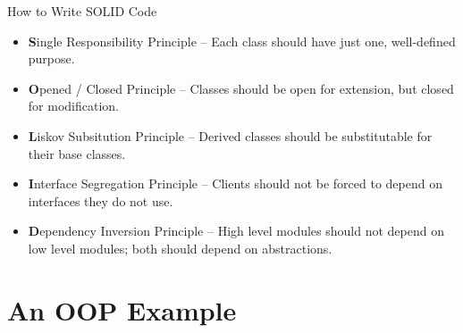 \documentclass[handout]{beamer}
\begin{document}
\begin{frame}{How to Write SOLID Code}
    \begin{itemize}[<+->]
        \item {\bf S}ingle Responsibility Principle -- Each class should have just one, well-defined purpose.
        \item {\bf O}pened / Closed Principle -- Classes should be open for extension, but closed for modification.
        \item {\bf L}iskov Subsitution Principle -- Derived classes should be substitutable for their base classes.
        \item {\bf I}nterface Segregation Principle -- Clients should not be forced to depend on interfaces they do not use.
        \item {\bf D}ependency Inversion Principle -- High level modules should not depend on low level modules; both should depend on abstractions.
    \end{itemize}
\end{frame}


\section{An OOP Example}
\end{document}
